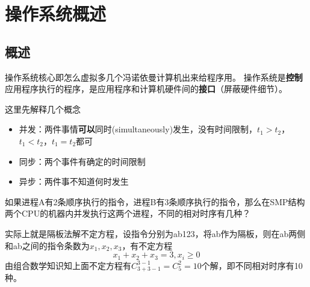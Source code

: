 
\section{操作系统概述}
\subsection{概述}
操作系统核心即怎么虚拟多几个冯诺依曼计算机出来给程序用。
操作系统是\textbf{控制}应用程序执行的程序，是应用程序和计算机硬件间的\textbf{接口}（屏蔽硬件细节）。

这里先解释几个概念
\begin{itemize}
	\item 并发：两件事情\textbf{可以}同时(simultaneously)发生，没有时间限制，$t_1>t_2$，$t_1<t_2$，$t_1=t_2$都可
	\item 同步：两个事件有确定的时间限制
	\item 异步：两件事不知道何时发生
\end{itemize}

\begin{example}
	如果进程A有2条顺序执行的指令，进程B有3条顺序执行的指令，那么在SMP结构两个CPU的机器内并发执行这两个进程，不同的相对时序有几种？
\end{example}
\begin{analysis}
	实际上就是隔板法解不定方程，设指令分别为ab123，将ab作为隔板，则在ab两侧和ab之间的指令条数为$x_1,x_2,x_3$，有不定方程
	\[x_1+x_2+x_3=3,x_i\geq 0\]
	由组合数学知识知上面不定方程有$C_{3+3-1}^{3-1}=C_5^2=10$个解，即不同相对时序有10种。
\end{analysis}


